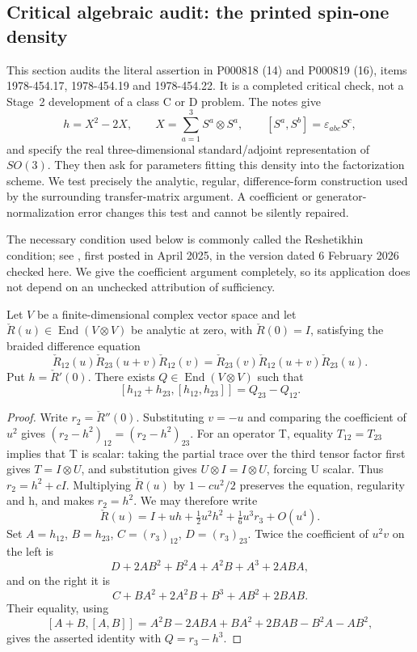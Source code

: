 \subsection{Critical algebraic audit: the printed spin-one density}

This section audits the literal assertion in P000818 (14) and P000819
(16), items 1978-454.17, 1978-454.19 and 1978-454.22. It is a completed
critical check, not a Stage~2 development of a class C or D problem.
The notes give
\[
 h=X^2-2X,\qquad X=\sum_{a=1}^3S^a\otimes S^a,
 \qquad [S^a,S^b]=\varepsilon_{abc}S^c,
\]
and specify the real three-dimensional standard/adjoint representation of
\(SO(3)\). They then ask for parameters fitting this density into the
factorization scheme. We test precisely the analytic, regular,
difference-form construction used by the surrounding transfer-matrix
argument. A coefficient or generator-normalization error changes this
test and cannot be silently repaired.

The necessary condition used below is commonly called the Reshetikhin
condition; see \citet[Sec.~2, eqs.~(1)--(6)]{zhang2025bootstrap}, first posted
in April 2025, in the version dated 6 February 2026 checked here. We give
the coefficient argument completely, so its application does not depend
on an unchecked attribution of sufficiency.

\begin{lemma}\ours{}
Let \(V\) be a finite-dimensional complex vector space and let
\(\check R(u)\in\operatorname{End}(V\otimes V)\) be analytic at zero,
with \(\check R(0)=I\), satisfying the braided difference equation
\[
 \check R_{12}(u)\check R_{23}(u+v)\check R_{12}(v)
 =\check R_{23}(v)\check R_{12}(u+v)\check R_{23}(u).
\]
Put \(h=\check R'(0)\). There exists
\(Q\in\operatorname{End}(V\otimes V)\) such that
\[
 [h_{12}+h_{23},[h_{12},h_{23}]]=Q_{23}-Q_{12}.
\]
\end{lemma}
\begin{proof}
Write \(r_2=\check R''(0)\). Substituting \(v=-u\) and comparing
the coefficient of \(u^2\) gives
\((r_2-h^2)_{12}=(r_2-h^2)_{23}\).
For an operator T, equality \(T_{12}=T_{23}\) implies that T is scalar:
taking the partial trace over the third tensor factor first gives
\(T=I\otimes U\), and substitution gives
\(U\otimes I=I\otimes U\), forcing U scalar. Thus
\(r_2=h^2+cI\). Multiplying \(\check R(u)\) by
\(1-cu^2/2\) preserves the equation, regularity and h, and makes
\(r_2=h^2\). We may therefore write
\[
 \check R(u)=I+uh+\tfrac12u^2h^2+\tfrac16u^3r_3+O(u^4).
\]
Set \(A=h_{12}\), \(B=h_{23}\), \(C=(r_3)_{12}\),
\(D=(r_3)_{23}\). Twice the coefficient of \(u^2v\) on the left is
\[
 D+2AB^2+B^2A+A^2B+A^3+2ABA,
\]
and on the right it is
\[
 C+BA^2+2A^2B+B^3+AB^2+2BAB.
\]
Their equality, using
\[
 [A+B,[A,B]]=A^2B-2ABA+BA^2+2BAB-B^2A-AB^2,
\]
gives the asserted identity with \(Q=r_3-h^3\).
\end{proof}


